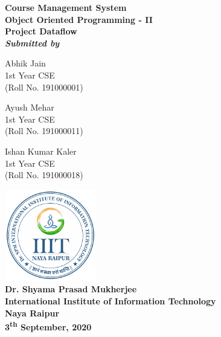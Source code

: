 \documentclass[12pt, a4paper]{article}
\begin{document}
\begin{center}
\Huge{\textbf{Course Management System}} \\
\vspace{1.5cm}
\Large{\textbf{Object Oriented Programming - II}} \\
\Large{\textbf{Project Dataflow}} \\
\vspace{5mm}
\large{\textbf{\textit{Submitted by}}}
\vspace{5mm}
\end{center}

\begin{center}
\begin{minipage}{0.30\textwidth}
		\begin{center}
				Abhik Jain \\
				1st Year CSE \\
				(Roll No. 191000001)
		\end{center}
\end{minipage}
\begin{minipage}{0.30\textwidth}
		\begin{center}
				Ayush Mehar \\
				1st Year CSE \\
				(Roll No. 191000011)
		\end{center}
\end{minipage}
\begin{minipage}{0.30\textwidth}
		\begin{center}
				Ishan Kumar Kaler\\
				1st Year CSE \\
				(Roll No. 191000018)
		\end{center}
\end{minipage}
\end{center}

\vspace{1.5cm}

\begin{center}
	\includegraphics[width=4cm]{figures/download.png} \\
\Large{\textbf{Dr. Shyama Prasad Mukherjee\\International Institute of Information Technology\\Naya Raipur}} \\
\vspace{2.5cm}
\Large{\textbf{3\textsuperscript{th} September, 2020}} \\
\end{center}
\end{document}
